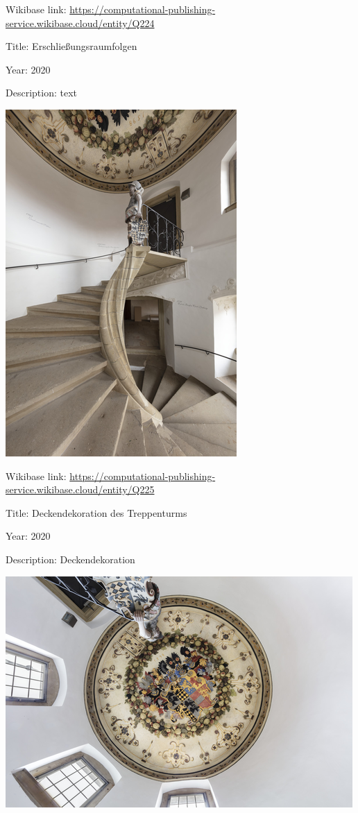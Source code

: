 \documentclass[
  letterpaper,
]{book}
\begin{document}
Wikibase link:
\url{https://computational-publishing-service.wikibase.cloud/entity/Q224}

Title: Erschließungsraumfolgen

Year: 2020

Description: text

\includegraphics{paintings_files/figure-pdf/cell-3-output-16.png}

Wikibase link:
\url{https://computational-publishing-service.wikibase.cloud/entity/Q225}

Title: Deckendekoration des Treppenturms

Year: 2020

Description: Deckendekoration

\includegraphics{paintings_files/figure-pdf/cell-3-output-18.png}
\end{document}
